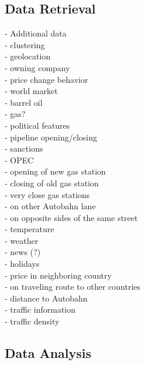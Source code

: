 \documentclass[%
a4paper,
DIV12,
2.5headlines,
bigheadings,
titlepage,
openbib,
]{scrartcl}
\begin{document}
\subsection{Data Retrieval}\label{data-retrieval}
- Additional data\\
 - clustering\\
  - geolocation\\
  - owning company\\
  - price change behavior\\
 - world market\\
  - barrel oil\\
  - gas?\\
 - political features\\
  - pipeline opening/closing\\
  - sanctions\\
  - OPEC\\
 - opening of new gas station\\
 - closing of old gas station\\
 - very close gas stations\\
  - on other Autobahn lane\\
  - on opposite sides of the same street\\
 - temperature\\
 - weather\\
 - news (?)\\
 - holidays\\
 - price in neighboring country\\
 - on traveling route to other countries\\
 - distance to Autobahn\\
 - traffic information\\
 - traffic density\\
 
 


\subsection{Data Analysis}\label{data-analysis}
\end{document}
